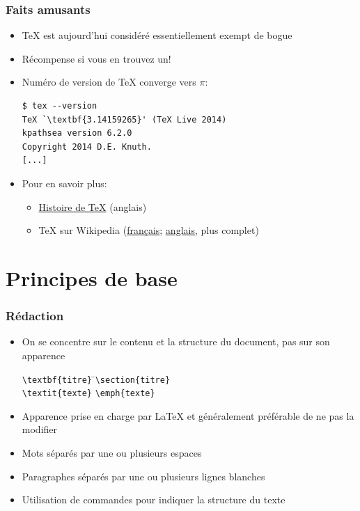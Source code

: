 \documentclass[aspectratio=54,10pt,xcolor=x11names]{beamer}
\theoremstyle{definition}
\begin{document}
\begin{frame}[fragile=singleslide]
  \frametitle{Faits amusants}
  \begin{itemize}
  \item {\TeX} est aujourd'hui considéré essentiellement exempt de bogue
  \item Récompense si vous en trouvez un!
  \item Numéro de version de {\TeX} converge vers $\pi$:
\begin{lstlisting}
$ tex --version
TeX `\textbf{3.14159265}' (TeX Live 2014)
kpathsea version 6.2.0
Copyright 2014 D.E. Knuth.
[...]
\end{lstlisting}
  \item Pour en savoir plus:
    \begin{itemize}
    \item \href{http://www.tug.org/whatis.html}{Histoire de \TeX} (anglais)
    \item {\TeX} sur Wikipedia
      (\href{http://fr.wikipedia.org/wiki/TeX}{français};
      \href{http://en.wikipedia.org/wiki/TeX}{anglais}, plus complet)
    \end{itemize}
  \end{itemize}
\end{frame}


\section{Principes de base}

\begin{frame}[fragile=singleslide]
  \frametitle{Rédaction}
  \begin{itemize}
  \item On se concentre sur le contenu et la \alert{structure} du
    document, pas sur son \alert{apparence}
      \bigskip
      \begin{tabbing}
        \verb=\textbf{titre}= \qquad\= \faArrowRight \qquad\= \verb|\section{titre}| \\[6pt]
        \verb|\textit{texte}| \> \faArrowRight \> \verb|\emph{texte}|
      \end{tabbing}
      \bigskip
  \item Apparence prise en charge par {\LaTeX} et généralement préférable de ne
    pas la modifier
  \item Mots séparés par une ou plusieurs \alert{espaces}
  \item Paragraphes séparés par une ou plusieurs \alert{lignes blanches}
  \item Utilisation de \alert{commandes} pour indiquer la structure du texte
  \end{itemize}
\end{frame}
\end{document}
